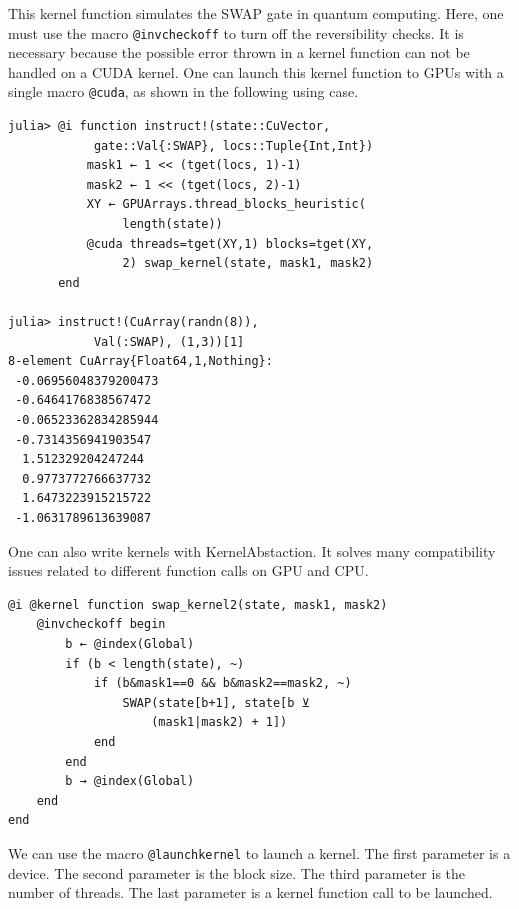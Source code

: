 \documentclass{article}
\newcommand{\<}{\langle}
\renewcommand{\>}{\rangle}
\theoremstyle{definition}\newtheorem{definition}{\textit{Definition}}
\begin{document}
This kernel function simulates the SWAP gate in quantum computing.
Here, one must use the macro \texttt{@invcheckoff} to turn off the reversibility checks. It is necessary because the possible error thrown in a kernel function can not be handled on a CUDA kernel.
One can launch this kernel function to GPUs with a single macro \texttt{@cuda}, as shown in the following using case.

\begin{minipage}{\columnwidth}
\begin{lstlisting}[multicols=2]
julia> @i function instruct!(state::CuVector,
            gate::Val{:SWAP}, locs::Tuple{Int,Int})
           mask1 ← 1 << (tget(locs, 1)-1)
           mask2 ← 1 << (tget(locs, 2)-1)
           XY ← GPUArrays.thread_blocks_heuristic(
                length(state))
           @cuda threads=tget(XY,1) blocks=tget(XY,
                2) swap_kernel(state, mask1, mask2)
       end

julia> instruct!(CuArray(randn(8)),
            Val(:SWAP), (1,3))[1]
8-element CuArray{Float64,1,Nothing}:
 -0.06956048379200473
 -0.6464176838567472
 -0.06523362834285944
 -0.7314356941903547
  1.512329204247244
  0.9773772766637732
  1.6473223915215722
 -1.0631789613639087
\end{lstlisting}
\end{minipage}

One can also write kernels with KernelAbstaction. It solves many compatibility issues related to different function calls on GPU and CPU.


\begin{minipage}{.88\columnwidth}
\begin{lstlisting}
@i @kernel function swap_kernel2(state, mask1, mask2)
    @invcheckoff begin
        b ← @index(Global)
        if (b < length(state), ~)
            if (b&mask1==0 && b&mask2==mask2, ~)
                SWAP(state[b+1], state[b ⊻ 
                    (mask1|mask2) + 1])
            end
        end
        b → @index(Global)
    end
end
\end{lstlisting}
\end{minipage}

We can use the macro \texttt{@launchkernel} to launch a kernel.
The first parameter is a device.
The second parameter is the block size.
The third parameter is the number of threads.
The last parameter is a kernel function call to be launched.
\end{document}
